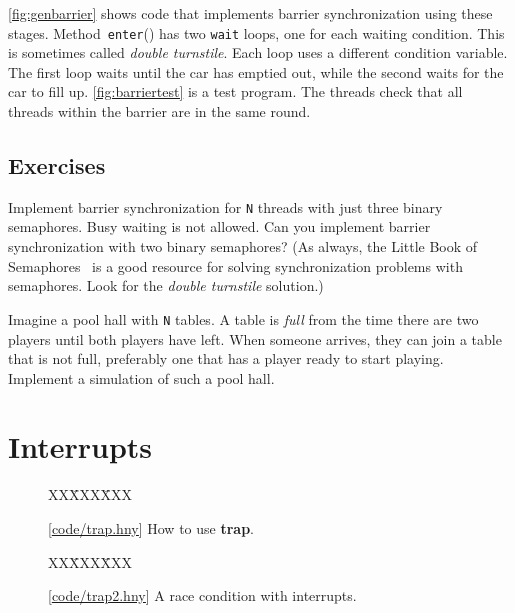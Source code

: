 \documentclass{report}
\newcommand{\harmonysource}[1]{
\begin{tabbing}
XX\=XXX\=XXX\kill
    
\end{tabbing}
}
\newcommand{\harmonylink}[1]{%
[\href{https://harmony.cs.cornell.edu/#1}{\underline{#1}}]%
}
\newenvironment{code}{
\tcolorbox
}{
\endtcolorbox
}
\begin{document}
\autoref{fig:genbarrier} shows code that implements barrier synchronization
using these stages.
Method~\texttt{enter}() has two \texttt{wait} loops, one for each
waiting condition.
This is sometimes called \emph{double turnstile}.
Each loop uses a different condition variable.
The first loop waits until the car has emptied out, while
the second waits for the car to fill up.
\autoref{fig:barriertest} is a test program.  The threads check
that all threads within the barrier are in the same round.

\section*{Exercises}
\begin{problems}
\item Implement barrier synchronization for \texttt{N} threads
with just three binary semaphores.  Busy waiting is not allowed.
Can you implement barrier synchronization with two binary semaphores?
(As always, the Little Book of Semaphores~\cite{Downey09} is a good resource
for solving synchronization problems with semaphores.
Look for the \emph{double turnstile}
%
solution.)
\item Imagine a pool hall with \texttt{N} tables.  A table is \emph{full}
from the time there are two players until both players have left.
When someone arrives, they can join a table that is not full, preferably
one that has a player ready to start playing.
Implement a simulation of such a pool hall.
\end{problems}

\chapter{Interrupts}
\label{ch:interrupts}

\begin{figure}
\begin{code}
\harmonysource{trap}
\end{code}
\caption{\harmonylink{code/trap.hny} How to use \textbf{trap}.}
\label{fig:trap}
\end{figure}

\begin{figure}
\begin{code}
\harmonysource{trap2}
\end{code}
\caption{\harmonylink{code/trap2.hny} A race condition with interrupts.}
\label{fig:trap2}
\end{figure}
\end{document}
